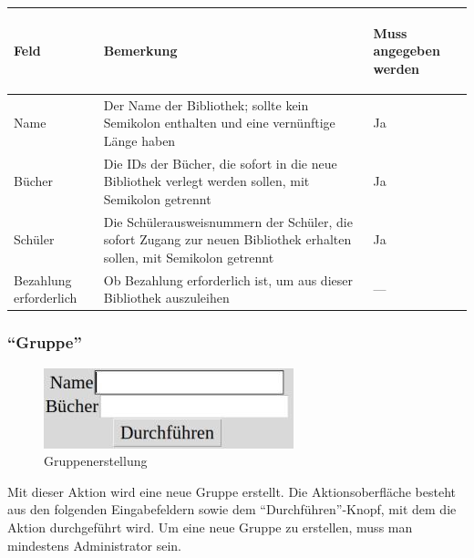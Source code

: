 \begin{tabular}{|p{}|p{}|p{}|}\hline
\begin{center}Feld\end{center} & \begin{center}Bemerkung\end{center} & \begin{center}Muss angegeben werden\end{center}\\
\hline
Name & Der Name der Bibliothek; sollte kein Semikolon enthalten und eine vernünftige Länge haben & Ja\\
\hline
Bücher & Die IDs der Bücher, die sofort in die neue Bibliothek verlegt werden sollen, mit Semikolon getrennt & Ja\\
\hline
Schüler & Die Schülerausweisnummern der Schüler, die sofort Zugang zur neuen Bibliothek erhalten sollen, mit Semikolon getrennt & Ja\\
\hline
Bezahlung erforderlich & Ob Bezahlung erforderlich ist, um aus dieser Bibliothek auszuleihen &  ---\\
\hline
\end{tabular}


\subsubsection{``Gruppe''}
\label{subsubsec:detail:new:group}
\begin{figure}\includegraphics{images/gui2/new_group.jpg}\caption{Gruppenerstellung}\label{fig:new_group}\end{figure}

Mit dieser Aktion wird eine neue Gruppe erstellt. Die Aktionsoberfläche besteht aus den folgenden Eingabefeldern sowie dem ``Durchführen''-Knopf, mit dem die Aktion durchgeführt wird.
Um eine neue Gruppe zu erstellen, muss man mindestens Administrator sein.

